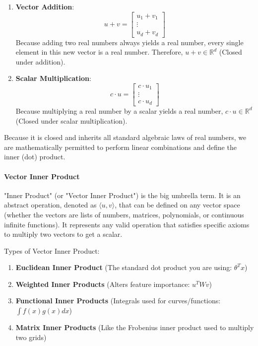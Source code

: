 \documentclass{article}
\begin{document}
\begin{enumerate}
    \item \textbf{Vector Addition}:
    \[ u + v = \begin{bmatrix} u_1 + v_1 \\ \vdots \\ u_d + v_d \end{bmatrix} \]
    Because adding two real numbers always yields a real number, every single element in this new vector is a real number. Therefore, $u + v \in \mathbb{R}^d$ (Closed under addition).

    \item \textbf{Scalar Multiplication}:
    \[ c \cdot u = \begin{bmatrix} c \cdot u_1 \\ \vdots \\ c \cdot u_d \end{bmatrix} \]
    Because multiplying a real number by a scalar yields a real number, $c \cdot u \in \mathbb{R}^d$ (Closed under scalar multiplication).
\end{enumerate}

Because it is closed and inherits all standard algebraic laws of real numbers, we are mathematically permitted to perform linear combinations and define the inner (dot) product.

\paragraph*{Vector Inner Product}
"Inner Product" (or "Vector Inner Product") is the big umbrella term. It is an abstract operation, denoted as $\langle u, v \rangle$, that can be defined on any vector space (whether the vectors are lists of numbers, matrices, polynomials, or continuous infinite functions). It represents any valid operation that satisfies specific axioms to multiply two vectors to get a scalar.

Types of Vector Inner Product:
\begin{enumerate}
    \item \textbf{Euclidean Inner Product} (The standard dot product you are using: $\theta^T x$)
    \item \textbf{Weighted Inner Products} (Alters feature importance: $u^T W v$)
    \item \textbf{Functional Inner Products} (Integrals used for curves/functions: $\int f(x)g(x)dx$)
    \item \textbf{Matrix Inner Products} (Like the Frobenius inner product used to multiply two grids)
\end{enumerate}
\end{document}
